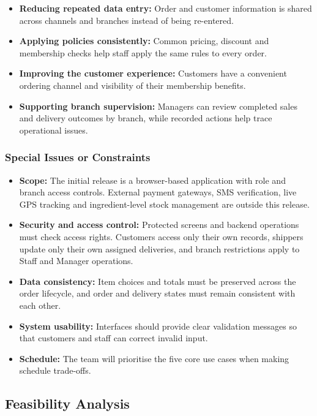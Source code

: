 \begin{itemize}
  \item \textbf{Reducing repeated data entry:} Order and customer information is shared across channels and branches instead of being re-entered.
  \item \textbf{Applying policies consistently:} Common pricing, discount and membership checks help staff apply the same rules to every order.
  \item \textbf{Improving the customer experience:} Customers have a convenient ordering channel and visibility of their membership benefits.
  \item \textbf{Supporting branch supervision:} Managers can review completed sales and delivery outcomes by branch, while recorded actions help trace operational issues.
\end{itemize}

\subsubsection{Special Issues or Constraints}

\begin{itemize}
  \item \textbf{Scope:} The initial release is a browser-based application with role and branch access controls. External payment gateways, SMS verification, live GPS tracking and ingredient-level stock management are outside this release.
  \item \textbf{Security and access control:} Protected screens and backend operations must check access rights. Customers access only their own records, shippers update only their own assigned deliveries, and branch restrictions apply to Staff and Manager operations.
  \item \textbf{Data consistency:} Item choices and totals must be preserved across the order lifecycle, and order and delivery states must remain consistent with each other.
  \item \textbf{System usability:} Interfaces should provide clear validation messages so that customers and staff can correct invalid input.
  \item \textbf{Schedule:} The team will prioritise the five core use cases when making schedule trade-offs.
\end{itemize}

\subsection{Feasibility Analysis}

